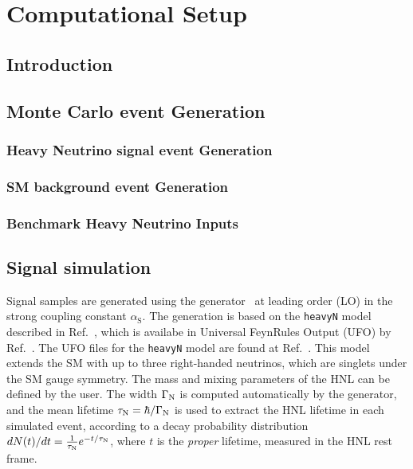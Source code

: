 \chapter{Computational Setup} %

\label{Chapter4} %


\section{Introduction}

\section{Monte Carlo event Generation}
\subsection{Heavy Neutrino signal event Generation}
\subsection{SM background event Generation}
\subsection{Benchmark Heavy Neutrino Inputs}

\section{Signal simulation}
\label{sec:signal}

Signal samples are generated using the \MGvATNLO
generator~\cite{Alwall:2014hca} at leading order (LO) in the strong
coupling constant $\alpha_{\mathrm{S}}$.
The generation is based on the \texttt{heavyN} model described in
Ref.~\cite{Atre:2009rg}, which is availabe in Universal FeynRules
Output (UFO) by Ref.~\cite{Alva:2014gxa,Degrande:2016aje}.
The UFO files for the \texttt{heavyN} model are found at
Ref.~\cite{heavyN}.
This model extends the SM with up to three right-handed neutrinos,
which are singlets under the SM gauge symmetry.
The mass and mixing parameters of the HNL can be defined by the user.
The width $\Gamma_{\mathrm{N}}$ is computed automatically by the
generator, and the mean lifetime $\tau_{\mathrm{N}} = \hbar/\Gamma_{\mathrm{N}}$
is used to extract the HNL lifetime in each simulated event,
according to a decay probability distribution
$dN(t)/dt = \frac{1}{\tau_{\mathrm{N}}}e^{-t/\tau_{\mathrm{N}}}$, where $t$ is the
\emph{proper} lifetime, measured in the HNL rest frame.

